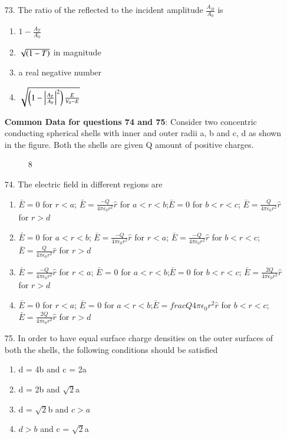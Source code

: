 \documentclass[journal]{IEEEtran}
\begin{document}
\begin{enumerate}
\begin{enumerate}[label=(\Alph*)]
      \end{enumerate}
    \item[73.] The ratio of the reflected to the incident amplitude $\frac{A_B}{A_0}$ is
      \begin{enumerate}[label = (\Alph*)]
        \item $1-\frac{A_T}{A_0}$
        \item $\sqrt{\left(1-T\right)}$ in magnitude
        \item a real negative number
        \item $\sqrt{\left(1-\left\vert\frac{A_T}{A_0}\right\vert^2\right)\frac{E}{V_0 - E}}$
      \end{enumerate}
    \textbf{Common Data for questions 74 and 75}: Consider two concentric conducting spherical shells with inner and outer radii a, b and c, d as shown in the figure. Both the shells are given Q amount of positive charges.
    \begin{figure}[!ht]
      \centering
      \caption{ 8}
      \label{fig 8}
  \end{figure}
    \item[74.] The electric field in different regions are 
      \begin{enumerate}[label=(\Alph*)]
        \item $\bar{E} = 0$ for $r < a$; $\bar{E} = \frac{-Q}{4\pi\epsilon_0r^2}\hat{r}$ for $a<r<b$;$\bar{E} = 0$ for $b< r < c$; $\bar{E} = \frac{Q}{4\pi\epsilon_0r^2}\hat{r}$ for $r>d$
        \item $\bar{E} = 0$ for $a < r < b$; $\bar{E} = \frac{-Q}{4\pi\epsilon_0r^2}\hat{r}$ for $r<a$; $\bar{E} = \frac{-Q}{4\pi\epsilon_0r^2}\hat{r}$ for $b< r < c$; $\bar{E} = \frac{Q}{4\pi\epsilon_0r^2}\hat{r}$ for $r>d$ 
        \item $\bar{E} = \frac{-Q}{4\pi\epsilon_0r^2}\hat{r}$ for $r < a$; $\bar{E}$ = 0 for $a<r<b$;$\bar{E} = 0$ for $b< r < c$; $\bar{E} = \frac{2Q}{4\pi\epsilon_0r^2}\hat{r}$ for $r>d$ 
        \item $\bar{E} = 0$ for $r < a$; $\bar{E}$ = 0 for $a<r<b$;$\bar{E} = frac{Q}{4\pi\epsilon_0r^2}\hat{r}$ for $b< r < c$; $\bar{E} = \frac{2Q}{4\pi\epsilon_0r^2}\hat{r}$ for $r>d $ 
      \end{enumerate}
    \item[75.] In order to have equal surface charge densities on the outer surfaces of both the shells, the following conditions should be satisfied
     \begin{enumerate}[label=(\Alph*)]
        \item d = 4b and c = 2a
        \item d = 2b and $\sqrt{2}$a
        \item d = $\sqrt{2}$b and $c>a$
        \item $d>b$ and c = $\sqrt{2}$a 
     \end{enumerate}

\end{enumerate}
\end{document}
